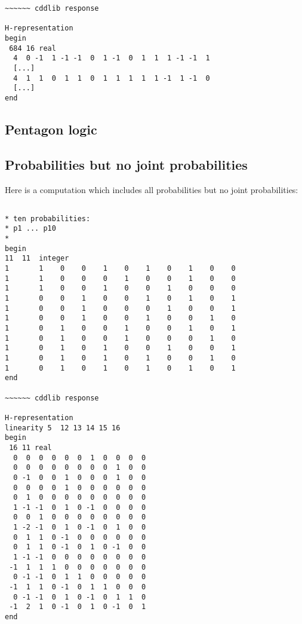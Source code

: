 \documentclass[%
  twocolumn,
 showpacs,
 showkeys,
 preprintnumbers,
 amsmath,amssymb,
 aps,
  pra,
  longbibliography,
 floatfix,
 ]{revtex4-1}
\begin{document}
{\begin{lstlisting}[backgroundcolor=\color{yellow!10},framerule=0pt,breaklines=true, frame=tb]
~~~~~~ cddlib response

H-representation
begin
 684 16 real
  4  0 -1  1 -1 -1  0  1 -1  0  1  1  1 -1 -1  1
  [...]
  4  1  1  0  1  1  0  1  1  1  1  1 -1  1 -1  0
  [...]
end

\end{lstlisting}  }


\subsection{Pentagon logic}

\subsection{Probabilities but no joint probabilities}

Here is a computation which includes all probabilities but no joint probabilities:



{ \begin{lstlisting}[backgroundcolor=\color{yellow!10},framerule=0pt,breaklines=true, frame=tb]

* ten probabilities:
* p1 ... p10
*
begin
11  11  integer
1       1    0    0    1    0    1    0    1    0    0
1       1    0    0    0    1    0    0    1    0    0
1       1    0    0    1    0    0    1    0    0    0
1       0    0    1    0    0    1    0    1    0    1
1       0    0    1    0    0    0    1    0    0    1
1       0    0    1    0    0    1    0    0    1    0
1       0    1    0    0    1    0    0    1    0    1
1       0    1    0    0    1    0    0    0    1    0
1       0    1    0    1    0    0    1    0    0    1
1       0    1    0    1    0    1    0    0    1    0
1       0    1    0    1    0    1    0    1    0    1
end

~~~~~~ cddlib response

H-representation
linearity 5  12 13 14 15 16
begin
 16 11 real
  0  0  0  0  0  0  1  0  0  0  0
  0  0  0  0  0  0  0  0  1  0  0
  0 -1  0  0  1  0  0  0  1  0  0
  0  0  0  0  1  0  0  0  0  0  0
  0  1  0  0  0  0  0  0  0  0  0
  1 -1 -1  0  1  0 -1  0  0  0  0
  0  0  1  0  0  0  0  0  0  0  0
  1 -2 -1  0  1  0 -1  0  1  0  0
  0  1  1  0 -1  0  0  0  0  0  0
  0  1  1  0 -1  0  1  0 -1  0  0
  1 -1 -1  0  0  0  0  0  0  0  0
 -1  1  1  1  0  0  0  0  0  0  0
  0 -1 -1  0  1  1  0  0  0  0  0
 -1  1  1  0 -1  0  1  1  0  0  0
  0 -1 -1  0  1  0 -1  0  1  1  0
 -1  2  1  0 -1  0  1  0 -1  0  1
end

\end{lstlisting}  }
\end{document}
